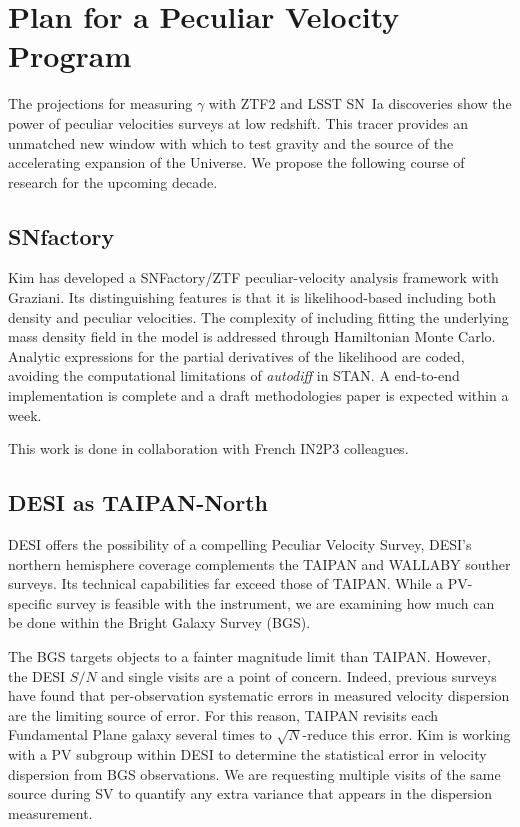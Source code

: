 \section{Plan for a Peculiar Velocity Program}
The projections for measuring $\gamma$ with ZTF2 and LSST SN~Ia discoveries
show the power of peculiar velocities surveys at low redshift.
This  tracer provides an unmatched  new window with which to test gravity and the source of the accelerating expansion of the Universe.
We propose the following course of research for the upcoming decade.

\subsection{SNfactory}
Kim has developed a SNFactory/ZTF peculiar-velocity analysis framework with Graziani.  Its distinguishing features is that it is likelihood-based
including both density and peculiar velocities.  The complexity of including fitting the underlying mass density field in the model
is addressed through Hamiltonian Monte Carlo.  Analytic expressions for the partial derivatives of the likelihood are coded,
avoiding the computational limitations of {\it autodiff} in STAN.  A end-to-end implementation is complete
and a draft methodologies paper is expected within a week.


This work is done in collaboration with French IN2P3 colleagues.

\subsection{DESI as TAIPAN-North}

DESI offers the possibility of a compelling Peculiar Velocity Survey,  DESI's northern hemisphere coverage complements 
the TAIPAN and WALLABY souther surveys.   Its technical capabilities far exceed those of TAIPAN.  While a PV-specific
survey is feasible with the instrument, we are examining how much can be done within the Bright Galaxy Survey (BGS).

The BGS targets objects to a fainter magnitude limit than TAIPAN.  However, the DESI $S/N$ and single visits are a point of concern.
Indeed, previous surveys have found that per-observation systematic errors in measured velocity dispersion are the limiting
source of error.  For this reason, TAIPAN revisits each Fundamental Plane galaxy several times to $\sqrt{N}$-reduce this error.
Kim is working with a PV subgroup within DESI to determine the statistical error in velocity dispersion from BGS observations.
We are requesting multiple visits of the same source during SV to quantify any extra variance that appears in
the dispersion measurement.

